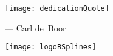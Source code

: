 \vspace*{\fill}

\begin{center}
  \texttt{[image: dedicationQuote]}
  
  \begin{minipage}{0.6\textwidth}%
    \begin{flushright}
      \small--- Carl de~Boor \cite{Boor16Comment}
    \end{flushright}
  \end{minipage}
\end{center}

\vspace*{\fill}

\begin{center}
  \texttt{[image: logoBSplines]}%
\end{center}

\vspace*{\fill}

\cleardoublepage
